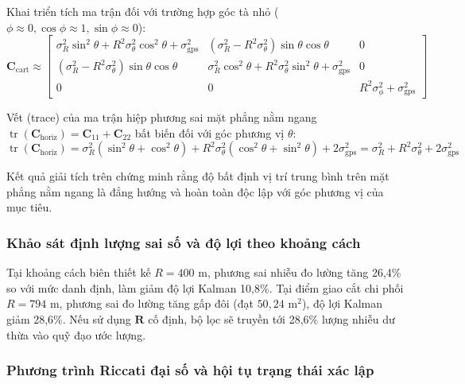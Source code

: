 Khai triển tích ma trận đối với trường hợp góc tà nhỏ ($\phi \approx 0, \cos\phi \approx 1, \sin\phi \approx 0$):
\begin{equation}
\mathbf{C}_{\text{cart}} \approx \begin{bmatrix}
\sigma_R^2 \sin^2\theta + R^2 \sigma_{\theta}^2 \cos^2\theta + \sigma_{\text{gps}}^2 & (\sigma_R^2 - R^2 \sigma_{\theta}^2) \sin\theta \cos\theta & 0 \\
(\sigma_R^2 - R^2 \sigma_{\theta}^2) \sin\theta \cos\theta & \sigma_R^2 \cos^2\theta + R^2 \sigma_{\theta}^2 \sin^2\theta + \sigma_{\text{gps}}^2 & 0 \\
0 & 0 & R^2 \sigma_{\phi}^2 + \sigma_{\text{gps}}^2
\end{bmatrix}
\label{eq:expanded-cartesian-covariance}
\end{equation}

Vết (trace) của ma trận hiệp phương sai mặt phẳng nằm ngang $\operatorname{tr}(\mathbf{C}_{\text{horiz}}) = \mathbf{C}_{11} + \mathbf{C}_{22}$ bất biến đối với góc phương vị $\theta$:
\begin{equation}
\operatorname{tr}(\mathbf{C}_{\text{horiz}}) = \sigma_R^2 (\sin^2\theta + \cos^2\theta) + R^2 \sigma_{\theta}^2 (\cos^2\theta + \sin^2\theta) + 2\sigma_{\text{gps}}^2 = \sigma_R^2 + R^2 \sigma_{\theta}^2 + 2\sigma_{\text{gps}}^2
\label{eq:trace-invariance}
\end{equation}

Kết quả giải tích trên chứng minh rằng độ bất định vị trí trung bình trên mặt phẳng nằm ngang là đẳng hướng và hoàn toàn độc lập với góc phương vị của mục tiêu.

\subsubsection{Khảo sát định lượng sai số và độ lợi theo khoảng cách}

\hspace{0.5cm} Tại khoảng cách biên thiết kế $R = 400$ m, phương sai nhiễu đo lường tăng 26,4\% so với mức danh định, làm giảm độ lợi Kalman 10,8\%. Tại điểm giao cắt chi phối $R = 794$ m, phương sai đo lường tăng gấp đôi (đạt $50{,}24$ $\text{m}^2$), độ lợi Kalman giảm 28,6\%. Nếu sử dụng $\mathbf{R}$ cố định, bộ lọc sẽ truyền tới 28,6\% lượng nhiễu dư thừa vào quỹ đạo ước lượng.

\subsubsection{Phương trình Riccati đại số và hội tụ trạng thái xác lập}


